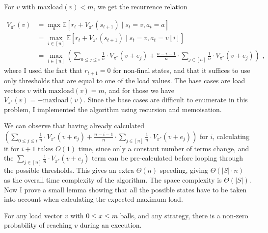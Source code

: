 For $v$ with $\mathrm{maxload}(v)<m$, we get the recurrence relation

\begin{equation} \label{eq:twothinning-dynamicprogramming}
\begin{split}
    V_{\pi^*}(v) &= \max_a \mathbb{E} [r_t + V_{\pi^*}(s_{t+1}) \mid s_t=v, a_t=a] \\
    &= \max_{i \in [n]} \mathbb{E} [r_t + V_{\pi^*}(s_{t+1}) \mid s_t=v, a_t=v[i]] \\
    &= \max_{i \in [n]} \left(\sum_{0\leq j \leq i} \frac{1}{n}\cdot V_{\pi^*}(v+e_j) + \frac{n-i-1}{n} \cdot  \sum_{j \in [n]} \frac{1}{n}\cdot V_{\pi^*}(v+e_j) \right) \text{ ,}
\end{split}
\end{equation}
where I used the fact that $r_{t+1}=0$ for non-final states, and that it suffices to use only thresholds that are equal to one of the load values. The base cases are load vectors $v$ with $\mathrm{maxload}(v)=m$, and for those we have $V_{\pi^*}(v)=-\mathrm{maxload}(v)$. Since the base cases are difficult to enumerate in this problem, I implemented the algorithm using recursion and memoisation. 


We can observe that having already calculated $(\sum_{0\leq j \leq i} \frac{1}{n}\cdot V_{\pi^*}(v+e_j) + \frac{n-i-1}{n} \cdot  \sum_{j \in [n]} \frac{1}{n}\cdot V_{\pi^*}(v+e_j))$ for $i$, calculating it for $i+1$ takes $O(1)$ time, since only a constant number of terms change, and the $\sum_{j \in [n]} \frac{1}{n}\cdot V_{\pi^*}(v+e_j)$ term can be pre-calculated before looping through the possible thresholds. This gives an extra $\Theta(n)$ speeding, giving $\Theta(|S|\cdot n)$ as the overall time complexity of the algorithm. The space complexity is $\Theta(|S|)$.\\


Now I prove a small lemma showing that all the possible states have to be taken into account when calculating the expected maximum load.


\begin{lemma} \label{lemma: everystatereachable}
For any load vector $v$ with $0\leq x\leq m$ balls, and any strategy, there is a non-zero probability of reaching $v$ during an execution.
\end{lemma}


